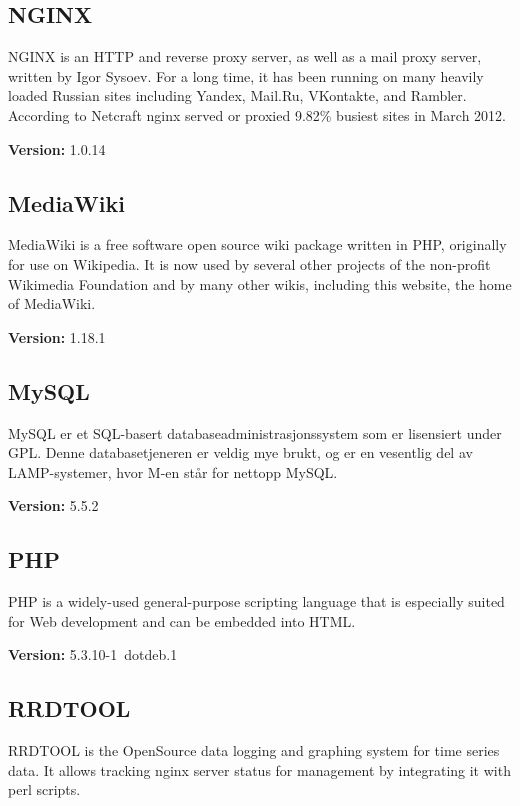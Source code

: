 \subsection{NGINX}
NGINX is an HTTP and reverse proxy server, as well as a mail proxy server, written by Igor Sysoev. For a long time, it has been running on many heavily loaded Russian sites including Yandex, Mail.Ru, VKontakte, and Rambler. According to Netcraft nginx served or proxied 9.82\% busiest sites in March 2012.\cite{nginx}
\begin{description}
\item{\textbf{Version: }}1.0.14
\end{description}
\subsection{MediaWiki}
MediaWiki is a free software open source wiki package written in PHP, originally for use on Wikipedia. It is now used by several other projects of the non-profit Wikimedia Foundation and by many other wikis, including this website, the home of MediaWiki.\cite{mediawiki}
\begin{description}
\item{\textbf{Version: }}1.18.1
\end{description}
\subsection{MySQL}
MySQL er et SQL-basert databaseadministrasjonssystem som er lisensiert under GPL. Denne databasetjeneren er veldig mye brukt, og er en vesentlig del av LAMP-systemer, hvor M-en står for nettopp MySQL.\cite{mysql}
\begin{description}
\item{\textbf{Version: }}5.5.2
\end{description}
\subsection{PHP}
PHP is a widely-used general-purpose scripting language that is especially suited for Web development and can be embedded into HTML.\cite{php}
\begin{description}
\item{\textbf{Version: }}5.3.10-1~dotdeb.1
\end{description}
\subsection{RRDTOOL}
RRDTOOL is the OpenSource data logging and graphing system for time series data. It allows tracking nginx server status for management by integrating it with perl scripts.
